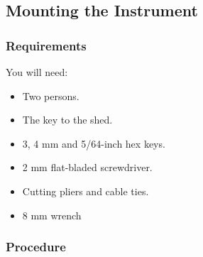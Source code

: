 \subsection{Mounting the Instrument}
\label{section:mounting-the-instrument}

\subsubsection{Requirements}

You will need:

\begin{itemize}
    \item Two persons.
    \item The key to the shed.
    \item 3, 4 mm and 5/64-inch hex keys.
    \item 2 mm flat-bladed screwdriver.
    \item Cutting pliers and cable ties.
    \item 8 mm wrench
\end{itemize}

\subsubsection{Procedure}

